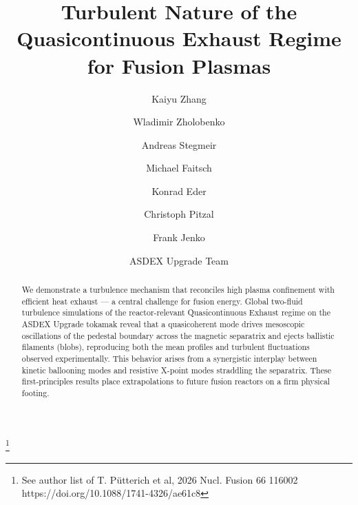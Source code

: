 \documentclass[aps,prl,twocolumn,superscriptaddress]{revtex4-2}
\begin{document}
\title{Turbulent Nature of the Quasicontinuous Exhaust Regime for Fusion Plasmas}

\author{Kaiyu Zhang}
\author{Wladimir Zholobenko}
\author{Andreas Stegmeir}
\author{Michael Faitsch}
\author{Konrad Eder}
\author{Christoph Pitzal}
\author{Frank Jenko}
\author{ASDEX Upgrade Team}
\thanks{See author list of T. Pütterich et al, 2026 Nucl. Fusion 66 116002 https://doi.org/10.1088/1741-4326/ae61c8}


\begin{abstract}

{We demonstrate a turbulence mechanism that reconciles high plasma confinement with efficient heat exhaust --- a central challenge for fusion energy. Global two-fluid turbulence simulations of the reactor-relevant Quasicontinuous Exhaust regime on the ASDEX Upgrade tokamak reveal that a quasicoherent mode drives mesoscopic oscillations of the pedestal boundary across the magnetic separatrix and ejects ballistic filaments (blobs), reproducing both the mean profiles and turbulent fluctuations observed experimentally.
This behavior arises from a synergistic interplay between kinetic ballooning modes and resistive X-point modes straddling the separatrix.
These first-principles results place extrapolations to future fusion reactors on a firm physical footing.}

\end{abstract}

\maketitle
\end{document}
